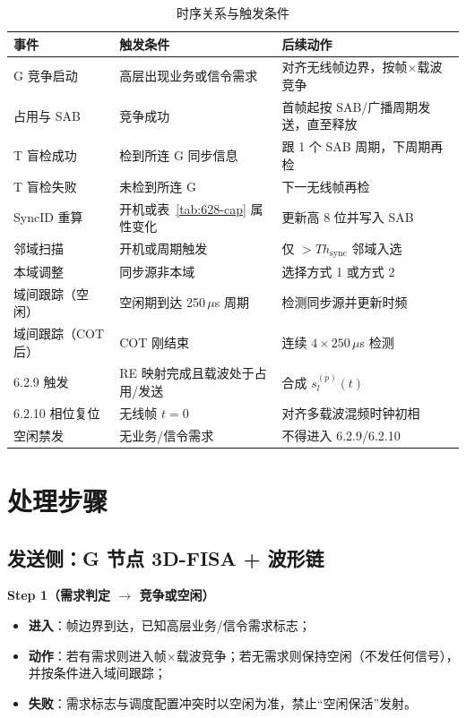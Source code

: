 \documentclass[11pt,a4paper]{ctexart}
\begin{document}
\begin{longtable}{L{3.2cm}L{5.5cm}L{5cm}}
\caption{时序关系与触发条件\label{tab:62710-trig}} \\
\toprule
\textbf{事件} & \textbf{触发条件} & \textbf{后续动作} \\
\midrule
G 竞争启动 & 高层出现业务或信令需求 & 对齐无线帧边界，按帧$\times$载波竞争 \\
占用与 SAB & 竞争成功 & 首帧起按 SAB/广播周期发送，直至释放 \\
T 盲检成功 & 检到所连 G 同步信息 & 跟 1 个 SAB 周期，下周期再检 \\
T 盲检失败 & 未检到所连 G & 下一无线帧再检 \\
SyncID 重算 & 开机或表~\ref{tab:628-cap} 属性变化 & 更新高 8 位并写入 SAB \\
邻域扫描 & 开机或周期触发 & 仅 $>Th_{\mathrm{sync}}$ 邻域入选 \\
本域调整 & 同步源非本域 & 选择方式 1 或方式 2 \\
域间跟踪（空闲） & 空闲期到达 250\,$\mu$s 周期 & 检测同步源并更新时频 \\
域间跟踪（COT 后） & COT 刚结束 & 连续 $4\times 250$\,$\mu$s 检测 \\
6.2.9 触发 & RE 映射完成且载波处于占用/发送 & 合成 $s_l^{(p)}(t)$ \\
6.2.10 相位复位 & 无线帧 $t{=}0$ & 对齐多载波混频时钟初相 \\
空闲禁发 & 无业务/信令需求 & 不得进入 6.2.9/6.2.10 \\
\bottomrule
\end{longtable}

\section{处理步骤}

\subsection{发送侧：G 节点 3D-FISA + 波形链}

\textbf{Step 1（需求判定 $\rightarrow$ 竞争或空闲）}
\begin{itemize}[nosep]
  \item \textbf{进入}：帧边界到达，已知高层业务/信令需求标志；
  \item \textbf{动作}：若有需求则进入帧$\times$载波竞争；若无需求则保持空闲（不发任何信号），并按条件进入域间跟踪；
  \item \textbf{失败}：需求标志与调度配置冲突时以空闲为准，禁止``空闲保活''发射。
\end{itemize}
\end{document}
